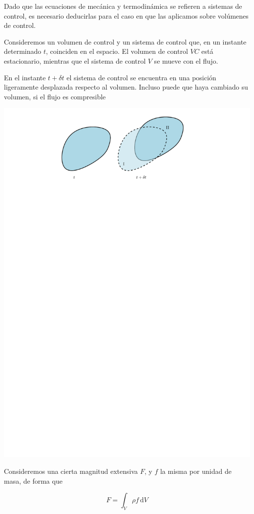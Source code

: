 	
	Dado que las ecuaciones de mecánica y termodinámica se refieren a
	sistemas de control, es necesario deducirlas para el caso en que las
	aplicamos sobre volúmenes de control.
	
	Consideremos un volumen de control y un sistema de control que, en
	un instante determinado $t$, coinciden en el espacio. El volumen
	de control $VC$ está estacionario, mientras que el sistema de control
	$V$ se mueve con el flujo.
	
		En el instante $t+\delta t$
				el sistema de control se encuentra en una posición ligeramente desplazada
				respecto al volumen. Incluso puede que haya cambiado su volumen, si
				el flujo es compresible
	
\begin{center}
	\includegraphics[width=0.7\linewidth]{TeX_files/chapter04-Dinamica/VC}
\end{center}


Consideremos una cierta magnitud extensiva $F$, y $f$ la misma por
unidad de masa, de forma que


\begin{equation}
	F=\int_{V}\rho f\,\text{d}V
\end{equation}


